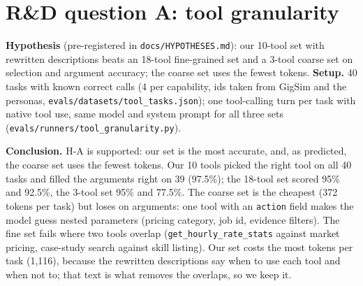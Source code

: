 \documentclass[10pt,a4paper]{article}
\newcommand{\file}[1]{\texttt{\small #1}}
\newcommand{\tablefrom}[2]{\begin{table}[h]\centering\caption{#2}\end{table}}
\begin{document}
\section{R\&D question A: tool granularity}
\textbf{Hypothesis} (pre-registered in \file{docs/HYPOTHESES.md}): our 10-tool set with rewritten descriptions beats
an 18-tool fine-grained set and a 3-tool coarse set on selection and argument accuracy; the coarse set uses the fewest
tokens. \textbf{Setup.} 40 tasks with known correct calls (4 per capability, ids taken from GigSim and the personas,
\file{evals/datasets/tool\_tasks.json}); one tool-calling turn per task with native tool use, same model and system
prompt for all three sets (\file{evals/runners/tool\_granularity.py}).
\tablefrom{tools}{Tool-design study on 40 tasks.}
\textbf{Conclusion.} H-A is supported: our set is the most accurate, and, as predicted, the coarse set uses the fewest
tokens. Our 10 tools picked the
right tool on all 40 tasks and filled the arguments right on 39 (97.5\%); the 18-tool set scored 95\% and 92.5\%, the
3-tool set 95\% and 77.5\%. The coarse set is the cheapest (372 tokens per task) but loses on arguments: one tool
with an \texttt{action} field makes the model guess nested parameters (pricing category, job id, evidence filters).
The fine set fails where two tools overlap (\texttt{get\_hourly\_rate\_stats} against market pricing, case-study
search against skill listing). Our set costs the most tokens per task (1,116), because the rewritten descriptions
say when to use each tool and when not to; that text is what removes the overlaps, so we keep it.

\end{document}
